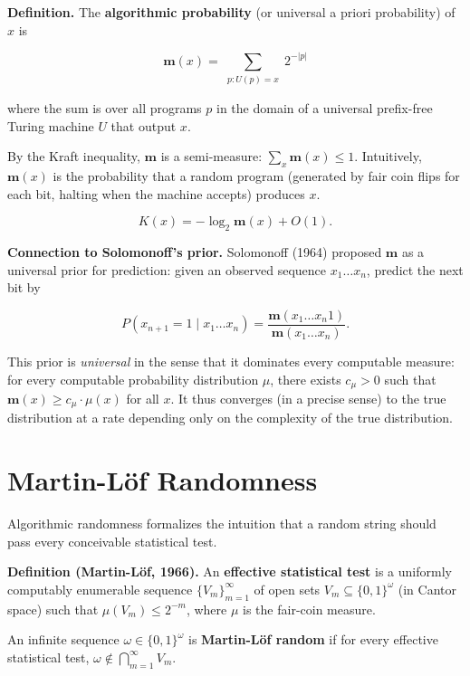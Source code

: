 \textbf{Definition.} The \textbf{algorithmic probability} (or universal a priori probability) of $x$ is

\[\mathbf{m}(x) = \sum_{\substack{p : U(p) = x}} 2^{-|p|}\]

where the sum is over all programs $p$ in the domain of a universal prefix-free Turing machine $U$ that output $x$.

By the Kraft inequality, $\mathbf{m}$ is a semi-measure: $\sum_x \mathbf{m}(x) \leq 1$. Intuitively, $\mathbf{m}(x)$ is the probability that a random program (generated by fair coin flips for each bit, halting when the machine accepts) produces $x$.

\begin{theorem}

\[K(x) = -\log_2 \mathbf{m}(x) + O(1).\]

\textbf{Connection to Solomonoff's prior.} Solomonoff (1964) proposed $\mathbf{m}$ as a universal prior for prediction: given an observed sequence $x_1 \ldots x_n$, predict the next bit by

\[P(x_{n+1} = 1 \mid x_1 \ldots x_n) = \frac{\mathbf{m}(x_1 \ldots x_n 1)}{\mathbf{m}(x_1 \ldots x_n)}.\]

This prior is \textit{universal} in the sense that it dominates every computable measure: for every computable probability distribution $\mu$, there exists $c_\mu > 0$ such that $\mathbf{m}(x) \geq c_\mu \cdot \mu(x)$ for all $x$. It thus converges (in a precise sense) to the true distribution at a rate depending only on the complexity of the true distribution.
\end{theorem}



\section{Martin-Löf Randomness}

Algorithmic randomness formalizes the intuition that a random string should pass every conceivable statistical test.

\textbf{Definition (Martin-Löf, 1966).} An \textbf{effective statistical test} is a uniformly computably enumerable sequence $\{ V_m\} _{m=1}^{\infty}$ of open sets $V_m \subseteq \{ 0,1\} ^\omega$ (in Cantor space) such that $\mu(V_m) \leq 2^{-m}$, where $\mu$ is the fair-coin measure.

An infinite sequence $\omega \in \{ 0,1\} ^\omega$ is \textbf{Martin-Löf random} if for every effective statistical test, $\omega \notin \bigcap_{m=1}^{\infty} V_m$.

